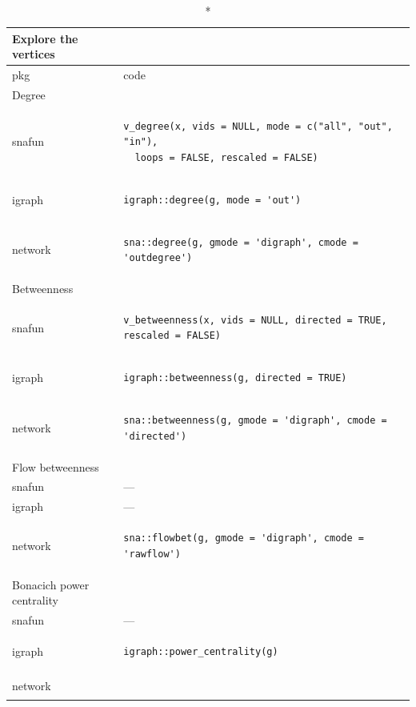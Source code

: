 \documentclass[
]{article}
\begin{document}
\captionsetup[table]{labelformat=empty,skip=1pt}
\setlength{\LTpost}{0mm}
\begin{longtable}{ll}
\caption*{
{\large Explore the vertices}
} \\ 
\toprule
pkg & code \\ 
\midrule
\multicolumn{1}{l}{Degree} \\ 
\midrule
snafun & \begin{verbatim}
v_degree(x, vids = NULL, mode = c("all", "out", "in"),
  loops = FALSE, rescaled = FALSE)
\end{verbatim} \\ 
igraph & \begin{verbatim}
igraph::degree(g, mode = 'out')
\end{verbatim} \\ 
network & \begin{verbatim}
sna::degree(g, gmode = 'digraph', cmode = 'outdegree')
\end{verbatim} \\ 
\midrule
\multicolumn{1}{l}{Betweenness} \\ 
\midrule
snafun & \begin{verbatim}
v_betweenness(x, vids = NULL, directed = TRUE, rescaled = FALSE)
\end{verbatim} \\ 
igraph & \begin{verbatim}
igraph::betweenness(g, directed = TRUE)
\end{verbatim} \\ 
network & \begin{verbatim}
sna::betweenness(g, gmode = 'digraph', cmode = 'directed')
\end{verbatim} \\ 
\midrule
\multicolumn{1}{l}{Flow betweenness} \\ 
\midrule
snafun & — \\ 
igraph & — \\ 
network & \begin{verbatim}
sna::flowbet(g, gmode = 'digraph', cmode = 'rawflow')
\end{verbatim} \\ 
\midrule
\multicolumn{1}{l}{Bonacich power centrality} \\ 
\midrule
snafun & — \\ 
igraph & \begin{verbatim}
igraph::power_centrality(g)
\end{verbatim} \\ 
network & \begin{verbatim}

\end{verbatim}
\end{longtable}
\end{document}
